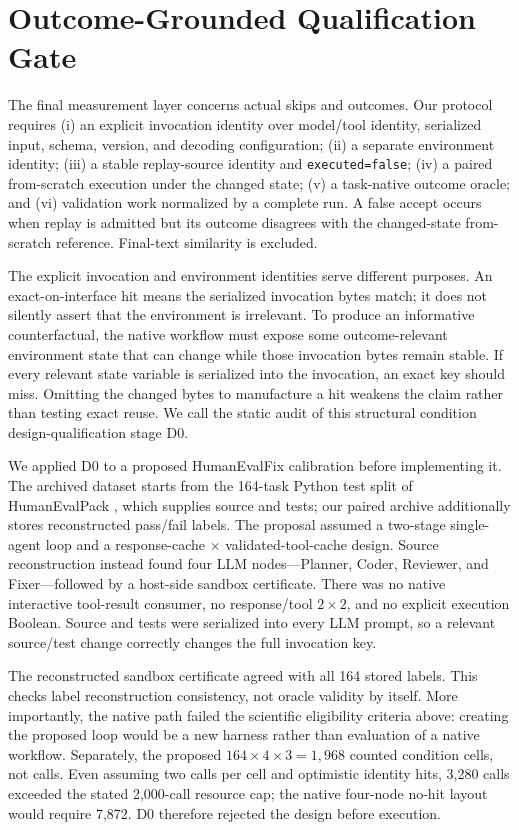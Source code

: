 \documentclass[letterpaper]{article} %
\begin{document}
\section{Outcome-Grounded Qualification Gate}

The final measurement layer concerns actual skips and outcomes. Our protocol
requires (i) an explicit invocation identity over model/tool identity,
serialized input, schema, version, and decoding configuration; (ii) a separate
environment identity; (iii) a stable replay-source identity and
\texttt{executed=false}; (iv) a paired from-scratch execution under the changed
state; (v) a task-native outcome oracle; and (vi) validation work normalized by
a complete run. A false accept occurs when replay is admitted but its outcome
disagrees with the changed-state from-scratch reference. Final-text similarity
is excluded.

The explicit invocation and environment identities serve different purposes.
An exact-on-interface hit means the serialized invocation bytes match; it does
not silently assert that the environment is irrelevant. To produce an
informative counterfactual, the native workflow must expose some
outcome-relevant environment state that can change while those invocation
bytes remain stable. If every relevant state variable is serialized into the
invocation, an exact key should miss. Omitting the changed bytes to manufacture
a hit weakens the claim rather than testing exact reuse. We call the static
audit of this structural condition design-qualification stage D0.

We applied D0 to a proposed HumanEvalFix calibration before implementing it.
The archived dataset starts from the 164-task Python test split of
HumanEvalPack \cite{octopack2023}, which supplies source and tests; our paired
archive additionally stores reconstructed pass/fail labels. The
proposal assumed a two-stage
single-agent loop and a response-cache $\times$ validated-tool-cache design.
Source reconstruction instead found four LLM nodes---Planner, Coder, Reviewer,
and Fixer---followed by a host-side sandbox certificate. There was no native
interactive tool-result consumer, no response/tool $2\times2$, and no explicit
execution Boolean. Source and tests were serialized into every LLM prompt, so
a relevant source/test change correctly changes the full invocation key.

The reconstructed sandbox certificate agreed with all 164 stored labels. This
checks label reconstruction consistency, not oracle validity by itself. More
importantly, the native path failed the scientific eligibility criteria above:
creating the proposed loop would be a new harness rather than evaluation of a
native workflow. Separately, the proposed $164\times4\times3=1{,}968$ counted
condition cells, not calls. Even assuming two calls per cell and optimistic
identity hits, 3,280 calls exceeded the stated 2,000-call resource cap; the
native four-node no-hit layout would require 7,872. D0 therefore rejected the
design before execution.
\end{document}
